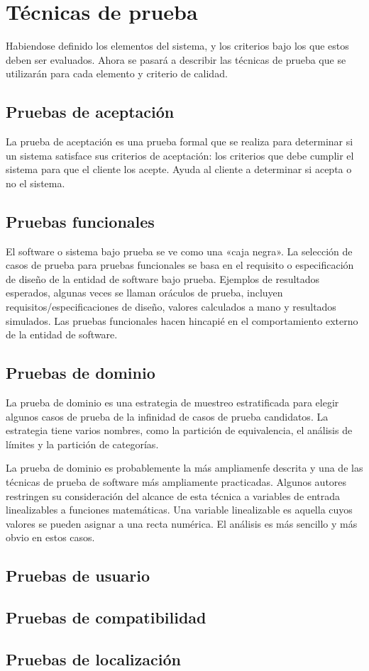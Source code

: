 \section{Técnicas de prueba}
Habiendose definido los elementos del sistema, y los criterios bajo los que
estos deben ser evaluados. Ahora se pasará a describir las técnicas de prueba
que se utilizarán para cada elemento y criterio de calidad.

\subsection{Pruebas de aceptación}
La prueba de aceptación es una prueba formal que se realiza para determinar si
un sistema satisface sus criterios de aceptación: los criterios que debe cumplir
el sistema para que el cliente los acepte. Ayuda al cliente a determinar si
acepta o no el sistema\cite{Naik}.

\subsection{Pruebas funcionales}
El software o sistema bajo prueba se ve como una «caja negra». La selección de
casos de prueba para pruebas funcionales se basa en el requisito o
especificación de diseño de la entidad de software bajo prueba. Ejemplos de
resultados esperados, algunas veces se llaman oráculos de prueba, incluyen
requisitos/especificaciones de diseño, valores calculados a mano y resultados
simulados. Las pruebas funcionales hacen hincapié en el comportamiento externo
de la entidad de software\cite{Luo}.

\subsection{Pruebas de dominio}
La prueba de dominio es una estrategia de muestreo estratificada para elegir
algunos casos de prueba de la infinidad de casos de prueba candidatos. La
estrategia tiene varios nombres, como la partición de equivalencia, el análisis
de límites y la partición de categorías.

La prueba de dominio es probablemente la más ampliamenfe descrita y una de las
técnicas de prueba de software más ampliamente practicadas. Algunos autores
restringen su consideración del alcance de esta técnica a variables de entrada
linealizables a funciones matemáticas. Una variable linealizable es aquella
cuyos valores se pueden asignar a una recta numérica. El análisis es más
sencillo y más obvio en estos casos\cite{Kaner}.

\subsection{Pruebas de usuario}
\subsection{Pruebas de compatibilidad}
\subsection{Pruebas de localización}

